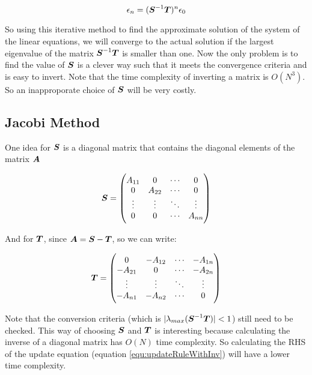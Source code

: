 \begin{equation}
	\epsilon_n = (\boldsymbol{S}^{-1}\boldsymbol{T})^n \epsilon_0
\end{equation}

So using this iterative method to find the approximate solution of the system of the linear equations, we will converge to the actual solution if the largest eigenvalue of the matrix $\boldsymbol{S}^{-1}\boldsymbol{T}$ is smaller than one. Now the only problem is to find the value of $\boldsymbol{S}$ is a clever way such that it meets the convergence criteria and is easy to invert. Note that the time complexity of inverting a matrix is $O(N^3)$. So an inapproporate choice of $\boldsymbol{S}$ will be very costly.

\subsection{Jacobi Method}
One idea for $\boldsymbol{S}$ is a diagonal matrix that contains the diagonal elements of the matrix $ \boldsymbol{A} $

\begin{equation}
	\boldsymbol{S} =
	\begin{pmatrix}
		A_{11} & 0  & \cdots & 0\\
		0 & A_{22}  & \cdots & 0\\
		\vdots & \vdots & \ddots & \vdots \\
		0 & 0 & \cdots & A_{nn}
	\end{pmatrix}
\end{equation}

And for $\boldsymbol{T}$, since $\boldsymbol{A} = \boldsymbol{S} - \boldsymbol{T}$, so we can write:

\begin{equation}
	\boldsymbol{T} = 
	\begin{pmatrix}
		0 & -A_{12} & \cdots & -A_{1n} \\
		-A_{21} & 0 & \cdots & -A_{2n} \\
		\vdots & \vdots & \ddots & \vdots \\
		-A_{n1} & -A_{n2} & \cdots & 0
	\end{pmatrix}
\end{equation}


Note that the conversion criteria (which is $|\lambda_{max}(\boldsymbol{S}^{-1}\boldsymbol{T})| < 1$) still need to be checked. This way of choosing $ \boldsymbol{S} $ and $ \boldsymbol{T} $ is interesting because calculating the inverse of a diagonal matrix has $O(N)$ time complexity. So calculating the RHS of the update equation (equation \ref{equ:updateRuleWithInv}) will have a lower time complexity.




